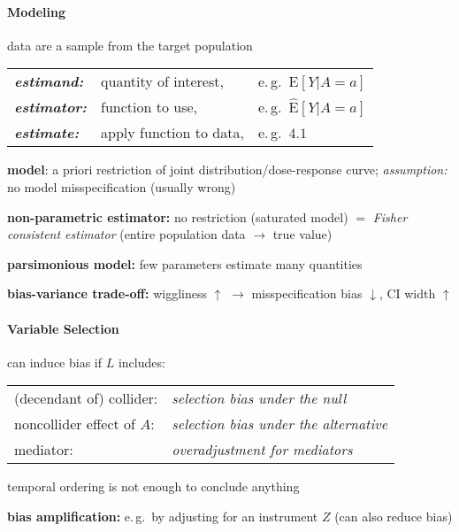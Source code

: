 \documentclass[8pt,twoside]{extarticle}
\begin{document}
\begin{multicols}{2}

\paragraph{Modeling} data are a sample from the target population \vspace{0.4em}

 \hspace{0.9em}\begin{tabular}{l l l}
\textbf{\it estimand:} & quantity  of interest, & e.\,g.\ $\mathrm{E}\left[Y|A=a\right]$ \\
\textbf{\it estimator:} & function to use, & e.\,g.\ $\widehat{\mathrm{E}}\left[Y|A=a\right]$ \\
\textbf{\it estimate:} & apply function to data, & e.\,g.\ $4.1$ 
\end{tabular} \vspace{0.5em}

 \textbf{model}: a priori restriction of joint distribution/dose-response curve;  \textit{assumption:} no model misspecification (usually wrong)

 \textbf{non-parametric estimator:} no restriction (saturated model) $=$ \textit{Fisher consistent estimator} (entire population data $\rightarrow$ true value)

 \textbf{parsimonious model:} few parameters estimate many quantities

 \textbf{bias-variance trade-off:} \newline wiggliness $\uparrow$ $\rightarrow$ misspecification bias $\downarrow$, CI width $\uparrow$

\paragraph{Variable Selection} can induce bias if $L$ includes: 

\hspace{-0.2em}
\begin{tabular}{l l }
 (decendant of) collider:& \textit{selection bias under the null}\\
 noncollider effect of $A$:& \textit{selection bias under the alternative}\\
 mediator:& \textit{overadjustment for mediators}
\end{tabular}

 temporal ordering is not enough to conclude anything

 \textbf{bias amplification:} e.\,g.\ by adjusting for an instrument $Z$ (can also reduce bias)




\end{multicols}
\end{document}
